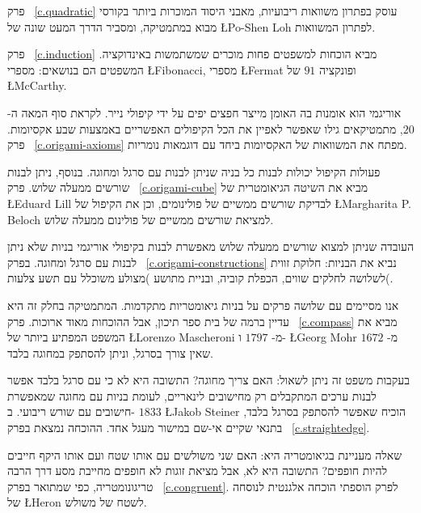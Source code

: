 פרק~%
\ref{c.quadratic}
עוסק בפתרון משוואות ריבועיות, מאבני היסוד המוכרות ביותר בקורסי מבוא במתמטיקה, ומסביר הדרך המעט שונה של
\L{Po-Shen Loh}
לפתרון המשוואות.

\newpage

פרק~%
\ref{c.induction}
מביא הוכחות למשפטים פחות מוכרים שמשתמשות באינדוקציה. המשפטים הם בנושאים: מספרי 
\L{Fibonacci}, 
מספרי
\L{Fermat}
ופונקציה 
$91$
של 
\L{McCarthy}.




אוריגמי הוא אומנות בה האומן מייצר חפצים יפים על ידי קיפולי נייר. לקראת סוף המאה ה-%
$20$,
מתמטיקאים גילו שאפשר לאפיין את הכל הקיפולים האפשריים באמצעות שבע אקסיומות. פרק%
~\ref{c.origami-axioms}
מפתח את המשוואות של האקסיומות ביחד עם דוגמאות נומריות.



פעולות הקיפול יכולות לבנות כל בניה שניתן לבנות עם סרגל ומחוגה. בנוסף, ניתן לבנות שורשים ממעלה שלוש. פרק~%
\ref{c.origami-cube}
מביא את השיטה הגיאומטרית של
\L{Eduard Lill}
לבדיקת שורשים ממשיים של פולינומים, וכן את הקיפול של
\L{Margharita P. Beloch}
למציאת שורשים ממשיים של פולינום ממעלה שלוש.

העובדה שניתן למצוא שורשים ממעלה שלוש מאפשרת לבנות בקיפולי אוריגמי בניות שלא ניתן לבנות עם סרגל ומחוגה. בפרק~%
\ref{c.origami-constructions}
נביא את הבניות: חלוקת זווית לשלושה לחלקים שווים, הכפלת קוביה, ובניית מתושע )מצולע משוכלל עם תשע צלעות(.


אנו מסיימים עם שלושה פרקים על בניות גיאומטריות מתקדמות. המתמטיקה בחלק זה היא עדיין ברמה של בית ספר תיכון, אבל ההוכחות מאוד ארוכות. פרק~%
\ref{c.compass}
מביא את המשפט המפתיע ביותר של 
\L{Lorenzo Mascheroni}
מ-%
$1797$
ו-%
\L{Georg Mohr} 
מ-%
$1672$
שאין צורך בסרגל, וניתן להסתפק במחוגה בלבד.

בעקבות משפט זה ניתן לשאול: האם צריך מחוגה? התשובה היא לא
כי עם סרגל בלבד אפשר לבנות ערכים המתקבלים רק מחישובים לינאריים, לעומת בניות עם מחוגה שמאפשרת חישובים עם שורש ריבועי. ב-%
$1833$
\L{Jakob Steiner}
הוכיח שאפשר להסתפק בסרגל בלבד, בתנאי שקיים אי-שם במישור מעגל אחד. ההוכחה נמצאת בפרק~%
\ref{c.straightedge}.

שאלה מעניינת בגיאומטריה היא: האם שני משולשים עם אותו שטח ועם אותו היקף חייבים להיות חופפים? התשובה היא לא, אבל מציאת זוגות לא חופפים מחייבת מסע דרך הרבה טריגונומטריה, כפי שמתואר בפרק~%
\ref{c.congruent}.
לפרק הוספתי הוכחה אלגנטית לנוסחה של 
\L{Heron}
לשטח של משולש.

